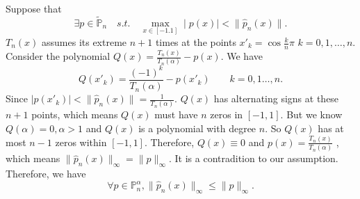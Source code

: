 \documentclass[twoside,a4paper]{article}
\begin{document}
Suppose that
$$\exists p\in\widetilde{\mathbb{P}}_n\quad s.t.\quad \max\limits_{x\in[-1.1]} \mid p\left( x \right) \mid <\lVert \hat{p}_n\left( x \right) \rVert.  $$
$T_n\left( x \right) $ assumes its extreme $n+1$ times at the  points $x'_k=\cos \frac{k}{n}\pi$ $k=0,1,\ldots,n$.
Consider the polynomial $Q\left( x \right)=\frac{T_n\left( x \right) }{T_n\left( \alpha \right) }-p\left( x \right) $. We have
\[
	Q\left( x'_{k} \right)=\frac{\left( -1 \right)^{k} }{T_n\left( \alpha \right) }-p\left( x'_k \right)  \qquad  k=0,1\ldots,n  
.\]
Since 
$\mid p\left( x'_k \right) \mid <\lVert \hat{p}_n\left( x \right) \rVert =\frac{1}{T_n\left( \alpha \right) } $.
$Q\left( x \right) $ has alternating signs at these $n+1$ points, which means  $Q\left( x \right) $ must have $n$ zeros in $[-1,1]$.
But we know  $Q\left( \alpha \right)=0, \alpha>1$ and $Q\left( x \right) $ is a polynomial with degree $n$. 
So  $Q\left( x \right) $ has at most $n-1$ zeros within  $[-1,1]$.
Therefore,  $Q\left( x \right)\equiv 0$ and $p\left( x \right)=\frac{T_n\left( x \right) }{T_n\left( \alpha \right) } $
, which means $\lVert \hat{p}_n\left( x \right) \rVert_\infty=\lVert p\rVert_\infty$. 
It is a contradition to our assumption.
Therefore, we have
\[
\forall p\in\mathbb{P}_n^{\alpha}, \lVert \hat{p}_n\left( x \right) \rVert_\infty\le \lVert p\rVert_\infty
.\] 
\end{document}
